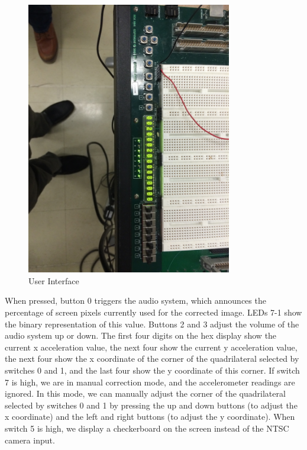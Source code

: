 \documentclass{article}
\begin{document}
\begin{center}
\begin{figure}[H]
\label{fig:ui}
\caption{User Interface}
\centering
\includegraphics[width=0.8\textwidth, angle=90]{./img/ui}
\end{figure}
\end{center}

When pressed, button 0 triggers the audio system, which announces the percentage of screen pixels currently used for the corrected image.
LEDs 7-1 show the binary representation of this value. 
Buttons 2 and 3 adjust the volume of the audio system up or down.
The first four digits on the hex display show the current x acceleration value,
the next four show the current y acceleration value,
the next four show the x coordinate of the corner of the quadrilateral selected by switches 0 and 1,
and the last four show the y coordinate of this corner.
If switch 7 is high, we are in manual correction mode,
and the accelerometer readings are ignored.
In this mode, we can manually adjust the corner of the quadrilateral selected by switches 0 and 1 by pressing the up and down buttons (to adjust the x coordinate) and the left and right buttons (to adjust the y coordinate).
When switch 5 is high, we display a checkerboard on the screen instead of the NTSC camera input.
\end{document}
